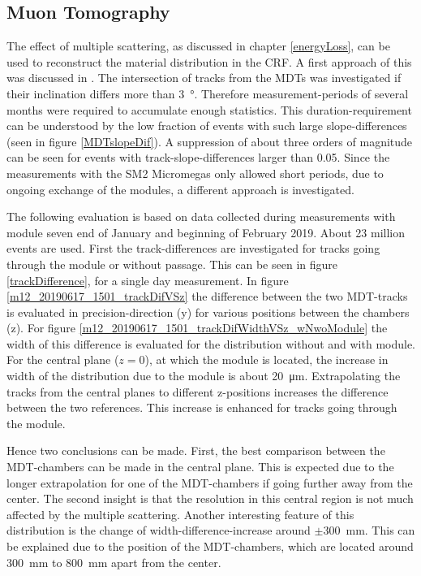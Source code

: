 \documentclass[
twoside,            %
BCOR1.4cm,          %
10pt,               %
headings=normal,    %
headsepline,        %
clearplainpage,		%
final,              %
div=14,
open=right,
bibliography=toc
]{scrreprt}
\begin{document}
\subsection{Muon Tomography}\label{muontomography}

The effect of multiple scattering, as discussed in chapter \ref{energyLoss}, can be used to reconstruct the material distribution in the CRF.
A first approach of this was discussed in \cite{loeselThesis}.
The intersection of tracks from the MDTs was investigated if their inclination differs more than \SI{3}{\degree}.
Therefore measurement-periods of several months were required to accumulate enough statistics.
This duration-requirement can be understood by the low fraction of events with such large slope-differences (seen in figure \ref{MDTslopeDif}).
A suppression of about three orders of magnitude can be seen for events with track-slope-differences larger than 0.05.
Since the measurements with the SM2 Micromegas only allowed short periods, due to ongoing exchange of the modules, a different approach is investigated.

The following evaluation is based on data collected during measurements with module seven end of January and beginning of February 2019.
About 23 million events are used.
First the track-differences are investigated for tracks going through the module or without passage.
This can be seen in figure \ref{trackDifference}, for a single day measurement.
In figure \ref{m12_20190617_1501_trackDifVSz} the difference between the two MDT-tracks is evaluated in precision-direction (y) for various positions between the chambers (z).
For figure \ref{m12_20190617_1501_trackDifWidthVSz_wNwoModule} the width of this difference is evaluated for the distribution without and with module.
For the central plane ($z = 0$), at which the module is located, the increase in width of the distribution due to the module is about \SI{20}{\micro\m}.
Extrapolating the tracks from the central planes to different z-positions increases the difference between the two references.
This increase is enhanced for tracks going through the module.

Hence two conclusions can be made.
First, the best comparison between the MDT-chambers can be made in the central plane.
This is expected due to the longer extrapolation for one of the MDT-chambers if going further away from the center.
The second insight is that the resolution in this central region is not much affected by the multiple scattering.
Another interesting feature of this distribution is the change of width-difference-increase around $\pm$\SI{300}{mm}.
This can be explained due to the position of the MDT-chambers, which are located around \SI{300}{mm} to \SI{800}{mm} apart from the center.
\end{document}
